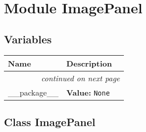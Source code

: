 %
%
%


\section{Module ImagePanel}

    \label{ImagePanel}


  \subsection{Variables}

    \vspace{-1cm}
\hspace{\varindent}\begin{longtable}{|p{\varnamewidth}|p{\vardescrwidth}|l}
\cline{1-2}
\cline{1-2} \centering \textbf{Name} & \centering \textbf{Description}& \\
\cline{1-2}
\endhead\cline{1-2}\multicolumn{3}{r}{\small\textit{continued on next page}}\\\endfoot\cline{1-2}
\endlastfoot\raggedright \_\-\_\-p\-a\-c\-k\-a\-g\-e\-\_\-\_\- & \raggedright \textbf{Value:} 
{\tt None}&\\
\cline{1-2}
\end{longtable}



\subsection{Class ImagePanel}


